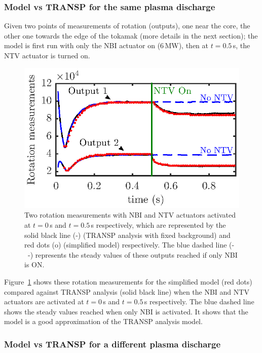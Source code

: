\documentclass[12pt]{iopart}
\begin{document}
\subsubsection{Model vs TRANSP for the same plasma discharge}
Given two points of measurements of rotation (outputs), one near the core, the other one towards the edge of the tokamak (more details in the next section); the model is first run with only the NBI actuator on ($6$\,MW), then at $t=0.5$\,s, the NTV actuator is turned on. 

\begin{figure}
\centering
\includegraphics{imene_figs/fig9} %
\caption{Two rotation measurements with NBI and NTV actuators activated at $t=0$\,s and $t=0.5$\,s respectively, which are represented by the solid black line (-) (TRANSP analysis with fixed background) and red dots (o) (simplified model) respectively. The blue dashed line (-~-) represents the steady values of these outputs reached if only NBI is ON.}
\label{Goum12}
\end{figure}

Figure~\ref{Goum12} shows these rotation measurements for the simplified model (red dots) compared against TRANSP analysis (solid black line) when the NBI and NTV actuators are activated at $t=0$\,s and $t=0.5$\,s respectively. The blue dashed line shows the steady values reached when only NBI is activated. It shows that the model is a good approximation of the TRANSP analysis model.



\subsubsection{Model vs TRANSP for a different plasma discharge}
\end{document}

